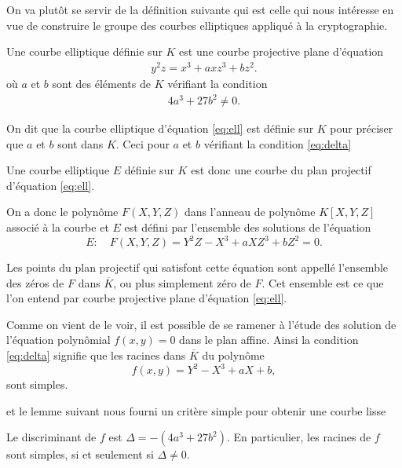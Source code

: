 
On va plutôt se servir de la définition suivante qui est celle qui nous intéresse en
vue de construire le groupe des courbes elliptiques appliqué à la cryptographie.

\begin{definition}
    \label{def:ell}
    Une courbe elliptique définie sur $K$ est une courbe projective plane d'équation
    \begin{align}
        \label{eq:ell}
    y^2z=x^3+axz^3+bz^2
    .\end{align}
    où $a$ et $b$ sont des éléments de $K$ vérifiant la condition
    \begin{align}
        \label{eq:delta}
    4a^3+27b^2\neq 0
    .\end{align}
\end{definition}

On dit que la courbe elliptique d'équation \ref{eq:ell} est définie sur $K$ pour préciser
que $a$ et $b$ sont dans $K$. Ceci pour $a$ et $b$ vérifiant la condition
\eqref{eq:delta}  

Une courbe elliptique $E$ définie sur $K$ est donc une courbe du plan projectif d'équation
\eqref{eq:ell}.

On a donc le polynôme $F(X,Y,Z)$ dans l'anneau de polynôme $K[X,Y,Z]$ associé à la courbe et
$E$ est défini par l'ensemble des solutions de l'équation 
\[
E:\quad F(X,Y,Z) = Y^2Z-X^3+aXZ^3+bZ^2 = 0
.\] 

Les points du plan projectif qui satisfont cette équation sont appellé l'ensemble des zéros
de $F$ dans $\overline{K}$, ou plus simplement zéro de $F$. Cet ensemble est ce que l'on
entend par courbe projective plane d'équation \eqref{eq:ell}. 

Comme on vient de le voir, il est possible de se ramener à l'étude
des solution de l'équation
polynômial $f(x,y) = 0$ dans le plan affine. Ainsi la condition \eqref{eq:delta}
signifie que les racines dans $\overline{K}$ du polynôme
\[
f(x,y) = Y^2 - X^3 + aX + b
,\] 
sont simples.

et le lemme suivant nous fourni un critère simple pour obtenir une courbe lisse

\begin{lemme}
    \label{lem:lemme1}
    Le discriminant de $f$ est $\Delta = -(4a^3 + 27b^2)$. En particulier, les racines de $f$ sont simples, si et seulement si $\Delta \neq 0$.
\end{lemme}

